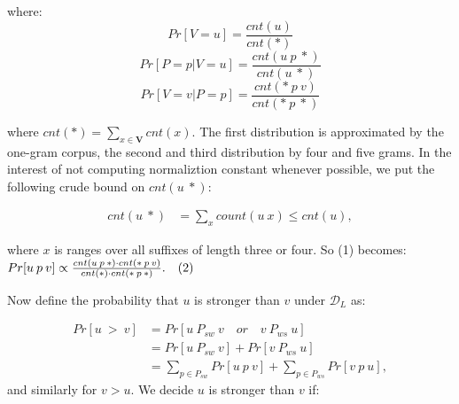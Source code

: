 where:
\[Pr[V = u]               = \frac{cnt(u)}{cnt(*)}\]
\[Pr[P = p | V = u]  = \frac{cnt(u \: p \: *)}{cnt(u \: *)}\]
\[Pr[V = v | P = p]  = \frac{cnt(* \: p \: v)}{cnt(* \: p \: *)}\]

where $cnt(*) = \sum_{x \in \mathbf{V}} cnt(x)$. The first distribution is approximated by the one-gram corpus, the second and third distribution by four and five grams. In the interest of not computing normaliztion constant whenever possible, we put the following crude bound on $cnt(u \: *)$:

\begin{align*}
cnt(u \: *) &= \sum_{x} count(u \: x) \leq cnt(u),
\end{align*}

where $x$ is ranges over all suffixes of length three or four. So (1) becomes:\\

\begin{math}
Pr[u \: p \: v] \propto \frac{ cnt(u \: p \: *) \cdot cnt(* \: p \: v) }{ cnt(*) \cdot cnt(* \: p \: *)}. \quad (2) \\
\end{math}

Now define the probability that $u$ is stronger than $v$ under $\mathcal{D}_L$ as:

\begin{align*}
	Pr[u \: > \: v] &= Pr[ u \: P_{sw} \: v  \quad or \quad v \: P_{ws} \: u] \\
					&= Pr[ u \: P_{sw} \: v] + Pr[ v \: P_{ws} \: u] \\
					&= \sum_{p \in P_{sw}} Pr[u \: p \: v] + \sum_{p \in P_{ws}} Pr[v \: p \: u],
\end{align*}
and similarly for $v > u$. We decide $u$ is stronger than $v$ if:


